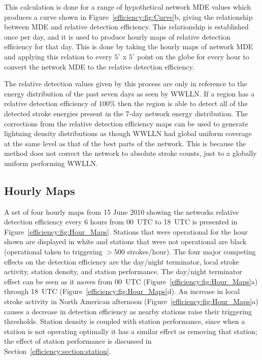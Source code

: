 This calculation is done for a range of hypothetical network MDE values which produces a curve shown in Figure~\ref{efficiency:fig:Curve}b, giving the relationship between MDE and relative detection efficiency.
This relationship is established once per day, and it is used to produce hourly maps of relative detection efficiency for that day.
This is done by taking the hourly maps of network MDE and applying this relation to every $5^\circ$ x $5^\circ$ point on the globe for every hour to convert the network MDE to the relative detection efficiency.

The relative detection values given by this process are only in reference to the energy distribution of the past seven days as seen by WWLLN.
If a region has a relative detection efficiency of 100\% then the region is able to detect all of the detected stroke energies present in the 7-day network energy distribution.
The corrections from the relative detection efficiency maps can be used to generate lightning density distributions as though WWLLN had global uniform coverage at the same level as that of the best parts of the network.
This is because the method does not correct the network to absolute stroke counts, just to a globally uniform performing WWLLN.

\subsection{Hourly Maps}

A set of four hourly maps from 15 June 2010 showing the networks relative detection efficiency every 6 hours from 00~UTC to 18~UTC is presented in Figure~\ref{efficiency:fig:Hour_Maps}.
Stations that were operational for the hour shown are displayed in white and stations that were not operational are black (operational taken to triggering $>500$ strokes/hour).
The four major competing effects on the detection efficiency are the day/night terminator, local stroke activity, station density, and station performance.
The day/night terminator effect can be seen as it moves from 00~UTC (Figure~\ref{efficiency:fig:Hour_Maps}a) through 18~UTC (Figure~\ref{efficiency:fig:Hour_Maps}d).
An increase in local stroke activity in North American afternoon (Figure~\ref{efficiency:fig:Hour_Maps}a) causes a decrease in detection efficiency as nearby stations raise their triggering thresholds.
Station density is coupled with station performance, since when a station is not operating optimally it has a similar effect as removing that station; the effect of station performance is discussed in Section~\ref{efficiency:section:station}.

